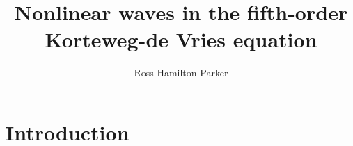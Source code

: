 \documentclass[11pt,reqno,oneside]{report}
\title{Nonlinear waves in the fifth-order Korteweg-de Vries equation}
\author{Ross Hamilton Parker}
\theoremstyle{plain}
\theoremstyle{definition}
\theoremstyle{remark}
\numberwithin{section}{chapter}
\numberwithin{equation}{chapter}
\numberwithin{figure}{chapter}
\newif\iffulldocument
\begin{document}


\begin{preliminaries}

\maketitle

\copyrightpage

\begin{signature}
\end{signature}

\begin{vita}\label{thesis:vita}
  
\end{vita}

\begin{dedication}\label{thesis:dedication}
  
\end{dedication}

\begin{acknowledgments}\label{thesis:acknowledgments}
  
\end{acknowledgments}

%   

\begin{spacing}{1} %
  \tableofcontents
  \clearpage{\pagestyle{empty}\cleardoublepage}

  \footnotesize
  \fontsize{11.5pt}{12.5pt}\selectfont
  \listoftables
  \clearpage{\pagestyle{empty}\cleardoublepage}

  \listoffigures
  \clearpage{\pagestyle{empty}\cleardoublepage}
  \normalsize
\end{spacing}

\end{preliminaries}

\pagestyle{plain}

\fulldocumenttrue

\chapter{Introduction}\label{chapter:intro}

\end{document}
